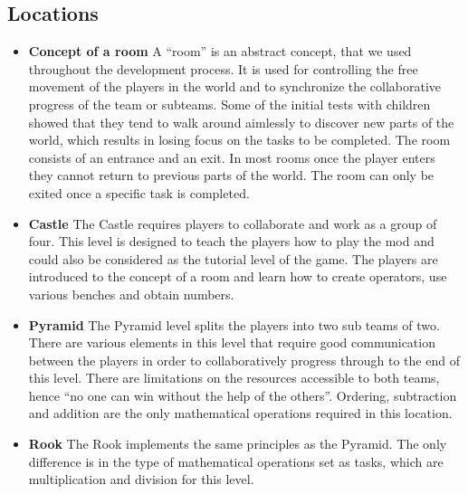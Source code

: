 \subsection{Locations}
\begin{itemize}

\item \textbf{Concept of a room}\newline
A “room” is an abstract concept, that we used throughout the development process. It is used for controlling the free movement of the players in the world and to synchronize the collaborative progress of the team or subteams. Some of the initial tests with children showed that they tend to walk around aimlessly to discover new parts of the world, which results in losing focus on the tasks to be completed.
The room consists of an entrance and an exit. In most rooms once the player enters they cannot return to previous parts of the world. The room can only be exited once a specific task is completed.

\item \textbf{Castle}\newline
The Castle requires players to collaborate and work as a group of four. This level is designed to teach the players how to play the mod and could also be considered as the tutorial level of the game. The players are introduced to the concept of a room and learn how to create operators, use various benches and obtain numbers.

\item \textbf{Pyramid}\newline
The Pyramid level splits the players into two sub teams of two. There are various elements in this level that require good communication between the players in order to collaboratively progress through to the end of this level. There are limitations on the resources accessible to both teams, hence ``no one can win without the help of the others''. Ordering, subtraction and addition are the only mathematical operations required in this location.

\item \textbf{Rook}\newline
The Rook implements the same principles as the Pyramid. The only difference is in the type of mathematical operations set as tasks, which are multiplication and division for this level.
\end{itemize}